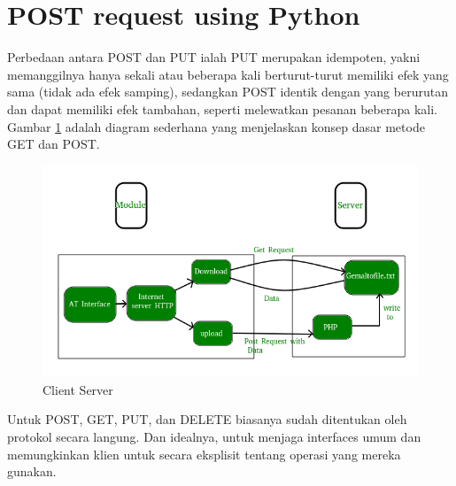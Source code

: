 \section{POST request using Python}
Perbedaan antara POST dan PUT ialah PUT merupakan idempoten, yakni memanggilnya hanya sekali atau beberapa kali berturut-turut memiliki efek yang sama (tidak ada efek samping), sedangkan POST identik dengan yang berurutan dan dapat memiliki efek tambahan, seperti melewatkan pesanan beberapa kali. Gambar \ref{3post} adalah diagram sederhana yang menjelaskan konsep dasar metode GET dan POST.

\begin{figure}[ht]
\centerline{\includegraphics[width=1\textwidth]{figures/3post.png}}
\caption{Client Server}
\label{3post}
\end{figure}

Untuk POST, GET, PUT, dan DELETE biasanya sudah ditentukan oleh protokol secara langung. Dan idealnya, untuk menjaga interfaces umum dan memungkinkan klien untuk secara eksplisit tentang operasi yang mereka gunakan\cite{rodriguez2008restful}.

